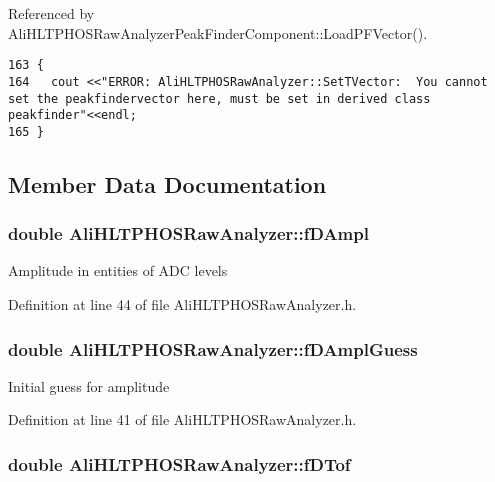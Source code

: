 Referenced by Ali\-HLTPHOSRaw\-Analyzer\-Peak\-Finder\-Component::Load\-PFVector().

\footnotesize\begin{verbatim}163 {
164   cout <<"ERROR: AliHLTPHOSRawAnalyzer::SetTVector:  You cannot set the peakfindervector here, must be set in derived class peakfinder"<<endl;
165 }
\end{verbatim}\normalsize 




\subsection{Member Data Documentation}
\subsubsection{\setlength{\rightskip}{0pt plus 5cm}double {\bf Ali\-HLTPHOSRaw\-Analyzer::f\-DAmpl}\hspace{0.3cm}{\tt  [protected, inherited]}}\label{classAliHLTPHOSRawAnalyzer_AliHLTPHOSRawAnalyzerPeakFinderp6}


Amplitude in entities of ADC levels 

Definition at line 44 of file Ali\-HLTPHOSRaw\-Analyzer.h.
\subsubsection{\setlength{\rightskip}{0pt plus 5cm}double {\bf Ali\-HLTPHOSRaw\-Analyzer::f\-DAmpl\-Guess}\hspace{0.3cm}{\tt  [protected, inherited]}}\label{classAliHLTPHOSRawAnalyzer_AliHLTPHOSRawAnalyzerPeakFinderp3}


Initial guess for amplitude 

Definition at line 41 of file Ali\-HLTPHOSRaw\-Analyzer.h.
\subsubsection{\setlength{\rightskip}{0pt plus 5cm}double {\bf Ali\-HLTPHOSRaw\-Analyzer::f\-DTof}\hspace{0.3cm}{\tt  [protected, inherited]}}\label{classAliHLTPHOSRawAnalyzer_AliHLTPHOSRawAnalyzerPeakFinderp5}



